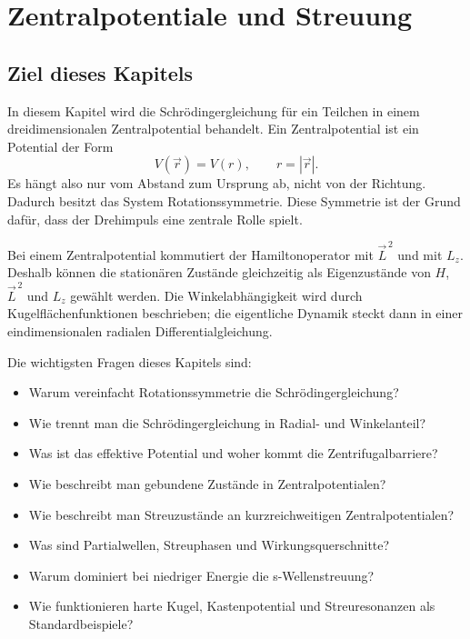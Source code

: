 \providecommand{\ket}[1]{\left|#1\right\rangle}
\providecommand{\bra}[1]{\left\langle#1\right|}
\providecommand{\braket}[2]{\left\langle#1\middle|#2\right\rangle}
\providecommand{\mel}[3]{\left\langle#1\middle|#2\middle|#3\right\rangle}
\providecommand{\dd}{\mathrm{d}}
\providecommand{\ii}{\mathrm{i}}
\providecommand{\e}{\mathrm{e}}
\providecommand{\eps}{\varepsilon}
\providecommand{\unit}{\mathbbm{1}}
\providecommand{\grad}{\nabla}
\providecommand{\laplace}{\Delta}

\chapter{Zentralpotentiale und Streuung}

\section{Ziel dieses Kapitels}

In diesem Kapitel wird die Schrödingergleichung für ein Teilchen in einem dreidimensionalen Zentralpotential behandelt. Ein Zentralpotential ist ein Potential der Form
\[
    V(\vec r)=V(r),
    \qquad r=|\vec r|.
\]
Es hängt also nur vom Abstand zum Ursprung ab, nicht von der Richtung. Dadurch besitzt das System Rotationssymmetrie. Diese Symmetrie ist der Grund dafür, dass der Drehimpuls eine zentrale Rolle spielt.

\begin{conceptbox}
Bei einem Zentralpotential kommutiert der Hamiltonoperator mit \(\vec L^{\,2}\) und mit \(L_z\). Deshalb können die stationären Zustände gleichzeitig als Eigenzustände von \(H\), \(\vec L^{\,2}\) und \(L_z\) gewählt werden. Die Winkelabhängigkeit wird durch Kugelflächenfunktionen beschrieben; die eigentliche Dynamik steckt dann in einer eindimensionalen radialen Differentialgleichung.
\end{conceptbox}

Die wichtigsten Fragen dieses Kapitels sind:
\begin{itemize}
    \item Warum vereinfacht Rotationssymmetrie die Schrödingergleichung?
    \item Wie trennt man die Schrödingergleichung in Radial- und Winkelanteil?
    \item Was ist das effektive Potential und woher kommt die Zentrifugalbarriere?
    \item Wie beschreibt man gebundene Zustände in Zentralpotentialen?
    \item Wie beschreibt man Streuzustände an kurzreichweitigen Zentralpotentialen?
    \item Was sind Partialwellen, Streuphasen und Wirkungsquerschnitte?
    \item Warum dominiert bei niedriger Energie die s-Wellenstreuung?
    \item Wie funktionieren harte Kugel, Kastenpotential und Streuresonanzen als Standardbeispiele?
\end{itemize}

